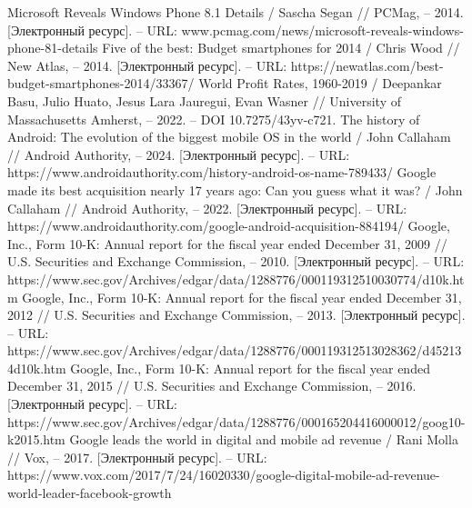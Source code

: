 \documentclass{article}
\begin{document}
\begin{thebibliography}{2}
 Microsoft Reveals Windows Phone 8.1 Details / Sascha Segan // PCMag, – 2014. [Электронный ресурс]. – URL: www.pcmag.com/news/microsoft-reveals-windows-phone-81-details
 Five of the best: Budget smartphones for 2014 / Chris Wood // New Atlas, – 2014. [Электронный ресурс]. – URL: https://newatlas.com/best-budget-smartphones-2014/33367/
 World Profit Rates, 1960-2019 / Deepankar Basu, Julio Huato, Jesus Lara Jauregui, Evan Wasner // University of Massachusetts Amherst, – 2022. – DOI 10.7275/43yv-c721.
 The history of Android: The evolution of the biggest mobile OS in the world / John Callaham // Android Authority, – 2024. [Электронный ресурс]. – URL: https://www.androidauthority.com/history-android-os-name-789433/
 Google made its best acquisition nearly 17 years ago: Can you guess what it was? / John Callaham // Android Authority, – 2022. [Электронный ресурс]. – URL: https://www.androidauthority.com/google-android-acquisition-884194/
 Google, Inc., Form 10-K: Annual report for the fiscal year ended December 31, 2009 // U.S. Securities and Exchange Commission, – 2010. [Электронный ресурс]. – URL: https://www.sec.gov/Archives/edgar/data/1288776/000119312510030774/d10k.htm
 Google, Inc., Form 10-K: Annual report for the fiscal year ended December 31, 2012 // U.S. Securities and Exchange Commission, – 2013. [Электронный ресурс]. – URL: https://www.sec.gov/Archives/edgar/data/1288776/000119312513028362/d452134d10k.htm
 Google, Inc., Form 10-K: Annual report for the fiscal year ended December 31, 2015 // U.S. Securities and Exchange Commission, – 2016. [Электронный ресурс]. – URL: https://www.sec.gov/Archives/edgar/data/1288776/000165204416000012/goog10-k2015.htm
 Google leads the world in digital and mobile ad revenue / Rani Molla // Vox, – 2017. [Электронный ресурс]. – URL: https://www.vox.com/2017/7/24/16020330/google-digital-mobile-ad-revenue-world-leader-facebook-growth
\end{thebibliography} 
\end{document}
